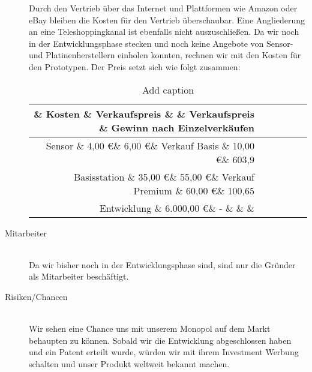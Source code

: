 \begin{description}
			Durch den Vertrieb über das Internet und Plattformen wie Amazon oder eBay bleiben die Kosten für den Vertrieb überschaubar. Eine Angliederung an eine Teleshoppingkanal ist ebenfalls nicht auszuschließen. Da wir noch in der Entwicklungsphase stecken und noch keine Angebote von Sensor- und Platinenherstellern einholen konnten, rechnen wir mit den Kosten für den Prototypen. Der Preis setzt sich wie folgt zusammen:
\begin{table}[htbp]
  \centering
  \caption{Add caption}
    \begin{tabular}{rrrrrr}
    \toprule
          \& Kosten \& Verkaufspreis \&       \& Verkaufspreis \& Gewinn nach Einzelverkäufen \\
    \midrule
    Sensor \& 4,00 \euro \& 6,00 \euro \& Verkauf Basis \& 10,00 \euro \& 603,9 \\
    Basisstation \& 35,00 \euro \& 55,00 \euro \& Verkauf Premium \& 60,00 \euro \& 100,65 \\
    Entwicklung \& 6.000,00 \euro \& -     \&       \&       \&  \\
    \bottomrule
    \end{tabular}%
  \label{tab:addlabel}%
\end{table}%
\item [Mitarbeiter] \hfill \\
			Da wir bisher noch in der Entwicklungsphase sind, sind nur die Gründer als Mitarbeiter beschäftigt. 
\item [Risiken/Chancen] \hfill \\
	Wir sehen eine Chance uns mit unserem Monopol auf dem Markt behaupten zu können. 
			Sobald wir die Entwicklung abgeschlossen haben und ein Patent erteilt wurde, würden wir mit ihrem Investment Werbung schalten und unser Produkt weltweit bekannt machen.
\end{description}
